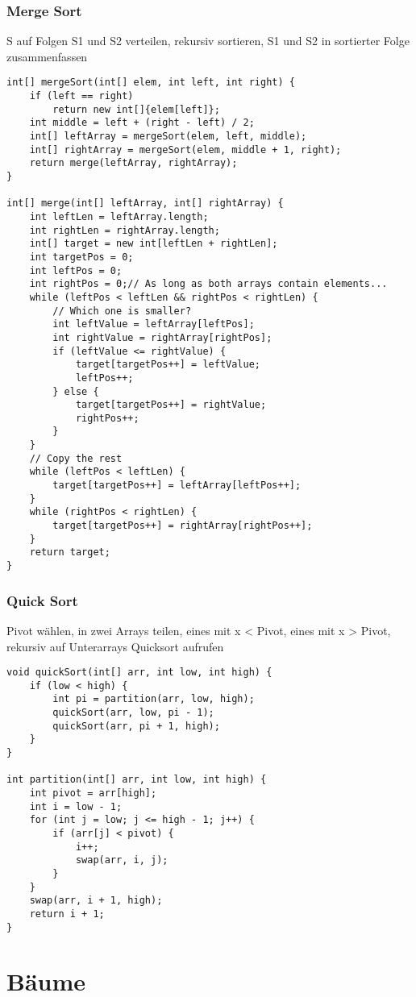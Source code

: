 \begin{multicols*}{5}
		\subsubsection{Merge Sort}
		S auf Folgen S1 und S2 verteilen, rekursiv sortieren, S1 und S2 in sortierter Folge zusammenfassen
			\begin{lstlisting}
int[] mergeSort(int[] elem, int left, int right) {
	if (left == right)
	  	return new int[]{elem[left]};
	int middle = left + (right - left) / 2;
	int[] leftArray = mergeSort(elem, left, middle);
	int[] rightArray = mergeSort(elem, middle + 1, right);
	return merge(leftArray, rightArray);
}

int[] merge(int[] leftArray, int[] rightArray) {
	int leftLen = leftArray.length;
	int rightLen = rightArray.length;
	int[] target = new int[leftLen + rightLen];
	int targetPos = 0;
	int leftPos = 0;
	int rightPos = 0;// As long as both arrays contain elements...
	while (leftPos < leftLen && rightPos < rightLen) {
		// Which one is smaller?
		int leftValue = leftArray[leftPos];
		int rightValue = rightArray[rightPos];
		if (leftValue <= rightValue) {
			target[targetPos++] = leftValue;
			leftPos++;
		} else {
			target[targetPos++] = rightValue;
			rightPos++;
		}
	}
    // Copy the rest
	while (leftPos < leftLen) {
		target[targetPos++] = leftArray[leftPos++];
	}
	while (rightPos < rightLen) {
		target[targetPos++] = rightArray[rightPos++];
	}
	return target;
}
			\end{lstlisting}
		
		\subsubsection{Quick Sort}
		Pivot wählen, in zwei Arrays teilen, eines mit x < Pivot, eines mit x > Pivot, rekursiv auf Unterarrays Quicksort aufrufen
			\begin{lstlisting}
void quickSort(int[] arr, int low, int high) {
	if (low < high) {
		int pi = partition(arr, low, high);
		quickSort(arr, low, pi - 1);
		quickSort(arr, pi + 1, high);
	}
}
	
int partition(int[] arr, int low, int high) {
	int pivot = arr[high];
	int i = low - 1;
	for (int j = low; j <= high - 1; j++) {
		if (arr[j] < pivot) {
			i++;
			swap(arr, i, j);
		}
	}
	swap(arr, i + 1, high);
	return i + 1;
}
			\end{lstlisting}
		
\section{Bäume}

\end{multicols*}
